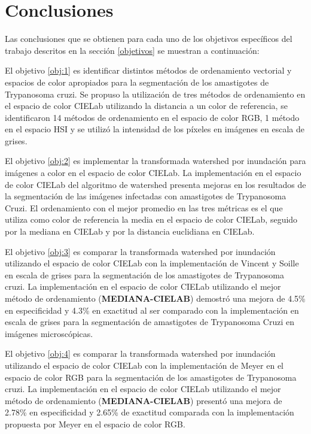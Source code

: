 \section{Conclusiones}
\label{chap:analisis}
Las conclusiones que se obtienen para cada uno de los objetivos específicos del trabajo descritos en la sección \ref{objetivos} se muestran a continuación:

El objetivo \ref{obj:1} es identificar distintos métodos de ordenamiento vectorial y espacios de color apropiados para la segmentación de los amastigotes de Trypanosoma cruzi. Se propuso la utilización de tres métodos de ordenamiento en el espacio de color CIELab utilizando la distancia a un color de referencia, se identificaron 14 métodos de ordenamiento en el espacio de color RGB, 1 método en el espacio HSI y se utilizó la intensidad de los píxeles en imágenes en escala de grises.

El objetivo \ref{obj:2} es implementar la transformada watershed por inundación para imágenes a color en el espacio de color CIELab. La implementación en el espacio de color CIELab del algoritmo de watershed presenta mejoras en los resultados de la segmentación de las imágenes infectadas con amastigotes de Trypanosoma Cruzi. El ordenamiento con el mejor promedio en las tres métricas es el que utiliza como color de referencia la media en el espacio de color CIELab, seguido por la mediana en CIELab y por la distancia euclidiana en CIELab.

El objetivo \ref{obj:3} es comparar la transformada watershed por inundación utilizando el espacio de color CIELab con la implementación de Vincent y Soille en escala de grises para la segmentación de los amastigotes de Trypanosoma cruzi. La implementación en el espacio de color CIELab utilizando el mejor método de ordenamiento (\textbf{MEDIANA-CIELAB}) demostró una mejora de 4.5\% en especificidad y 4.3\% en exactitud al ser comparado con la implementación en escala de grises para la segmentación de amastigotes de Trypanosoma Cruzi en imágenes microscópicas.

El objetivo \ref{obj:4} es comparar la transformada watershed por inundación utilizando el espacio de color CIELab con la implementación de Meyer en el espacio de color RGB para la segmentación de los amastigotes de Trypanosoma cruzi. La implementación en el espacio de color CIELab utilizando el mejor método de ordenamiento (\textbf{MEDIANA-CIELAB}) presentó una mejora de 2.78\% en especificidad y 2.65\% de exactitud comparada con la implementación propuesta por Meyer en el espacio de color RGB.

